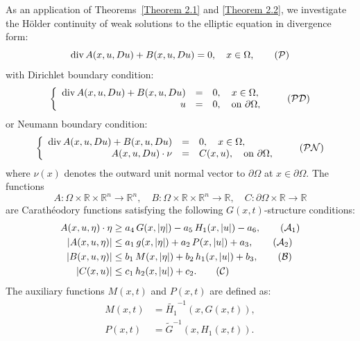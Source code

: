 \documentclass[10pt,reqno]{amsart}
\newcommand *\w{^\wedge}
\theoremstyle{definition}
\numberwithin{equation}{section}
\begin{document}
As an application of Theorems~\ref{Theorem 2.1} and \ref{Theorem 2.2}, we investigate the Hölder continuity of weak solutions to the elliptic equation in divergence form:
\begin{equation}\label{P}
\operatorname{div} A(x, u, Du) + B(x, u, Du) = 0, \quad x \in \Omega, \tag{$\mathcal{P}$}
\end{equation}
with Dirichlet boundary condition:
\begin{equation}\label{PD}
\left\lbrace\begin{array}{rcl}
\operatorname{div} A(x, u, Du) + B(x, u, Du) &=& 0, \quad x \in \Omega,\\
u &=& 0, \quad \text{on } \partial\Omega,
\end{array}\right. \tag{$\mathcal{PD}$}
\end{equation}
or Neumann boundary condition:
\begin{equation}\label{PN}
\left\lbrace\begin{array}{rcl}
\operatorname{div} A(x, u, Du) + B(x, u, Du) &=& 0, \quad x \in \Omega,\\
A(x, u, Du)\cdot\nu &=& C(x,u), \quad \text{on } \partial\Omega,
\end{array}\right. \tag{$\mathcal{PN}$}
\end{equation}
where \( \nu(x) \) denotes the outward unit normal vector to \( \partial\Omega \) at \( x \in \partial\Omega \). The functions
\[
A : \Omega \times \mathbb{R} \times \mathbb{R}^n \rightarrow \mathbb{R}^n,\quad
B : \Omega \times \mathbb{R} \times \mathbb{R}^n \rightarrow \mathbb{R},\quad
C : \partial\Omega \times \mathbb{R} \rightarrow \mathbb{R}
\]
are Carathéodory functions satisfying the following \( G(x,t) \)-structure conditions:
\begin{align}
A(x, u, \eta) \cdot \eta &\geq a_4\, G(x,|\eta|) - a_5\, H_1(x,|u|) - a_6, \tag{$\mathcal{A}_1$}\label{6.31}\\
|A(x, u, \eta)| &\leq a_1\, g(x,|\eta|) + a_2\, P(x,|u|) + a_3,  \tag{$\mathcal{A}_2$}\label{6.41}\\
|B(x, u, \eta)| &\leq b_1\, M(x,|\eta|) + b_2\, h_1(x,|u|) + b_3, \tag{$\mathcal{B}$}\label{6.51}\\
|C(x, u)| &\leq c_1\, h_2(x,|u|) + c_2. \tag{$\mathcal{C}$}\label{6.61}
\end{align}
The auxiliary functions \( M(x,t) \) and \( P(x,t) \) are defined as:
\begin{align}
M(x,t) &= \widetilde{H_1}^{-1}(x,G(x,t)), \label{6.71}\\
P(x,t) &= \widetilde{G}^{-1}(x,H_1(x,t)). \label{6.81}
\end{align}
\end{document}
